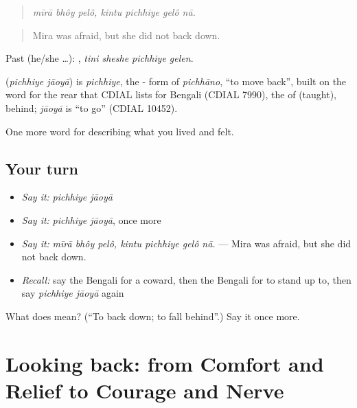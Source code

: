 \begin{quote}
\emph{mīrā bhôy pelô, kintu pichhiye gelô nā.}
\end{quote}

\begin{quote}
Mira was afraid, but she did not back down.
\end{quote}

Past (he/she …):    , \emph{tini sheshe pichhiye gelen}.

\begin{cousinweb}
\textbf{ } (\emph{pichhiye jāoyā}) is \emph{pichhiye}, the - form of \emph{pichhāno}, \textquotedblleft{}to move back\textquotedblright{}, built on the word for the rear that CDIAL lists for Bengali (CDIAL 7990), the  of  (taught), behind; \emph{jāoyā} is \textquotedblleft{}to go\textquotedblright{} (CDIAL 10452).
\end{cousinweb}

\begin{grammarlens}[title={What you've built}]
One more word for describing what you lived and felt.
\end{grammarlens}

\subsection*{Your turn}
\begin{itemize}
\raggedright
  \item \emph{Say it:} \emph{pichhiye jāoyā}
  \item \emph{Say it:} \emph{pichhiye jāoyā}, once more
  \item \emph{Say it:} \emph{mīrā bhôy pelô, kintu pichhiye gelô nā.} — Mira was afraid, but she did not back down.
  \item \emph{Recall:} say the Bengali for a coward, then the Bengali for to stand up to, then say \emph{pichhiye jāoyā} again
\end{itemize}

\begin{tcolorbox}[breakable,colback=teal!4,colframe=teal!35!black,title={Before you move on}]
What does   mean? (\textquotedblleft{}To back down; to fall behind\textquotedblright{}.) Say it once more.
\end{tcolorbox}
\section[(dialogue)]{Looking back: from Comfort and Relief to Courage and Nerve}

